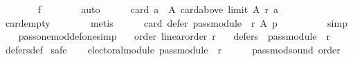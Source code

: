 \begin{isabellebody}
\ \ \ \ \ \ \isamarkupfalse%
\ f{}\isanewline
\ \ \ \ \ \ \isamarkupfalse%
\ auto\isanewline
\ \ \ \ \isamarkupfalse%
\ {\isachardoublequoteopen}card\ {\isacharbraceleft}{\kern0pt}a\ {\isasymin}\ A{\isachardot}{\kern0pt}\ card{\isacharparenleft}{\kern0pt}above\ {\isacharparenleft}{\kern0pt}limit\ A\ r{\isacharparenright}{\kern0pt}\ a{\isacharparenright}{\kern0pt}\ {\isasymle}\ {}{\isacharbraceright}{\kern0pt}\ {\isacharequal}{\kern0pt}\ {}{\isachardoublequoteclose}\isanewline
\ \ \ \ \ \ \isamarkupfalse%
\ card{\isachardot}{\kern0pt}empty\isanewline
\ \ \ \ \ \ \isamarkupfalse%
\ metis\isanewline
\ \ \ \ \isamarkupfalse%
\ {\isachardoublequoteopen}card\ {\isacharparenleft}{\kern0pt}defer\ {\isacharparenleft}{\kern0pt}pass{\isacharunderscore}{\kern0pt}module\ {}\ r{\isacharparenright}{\kern0pt}\ A\ p{\isacharparenright}{\kern0pt}\ {\isacharequal}{\kern0pt}\ {}{\isachardoublequoteclose}\isanewline
\ \ \ \ \ \ \isamarkupfalse%
\ simp\isanewline
\ \ \isamarkupfalse%
\isanewline
{}\isamarkupfalse%
%
\endisatagproof
{\isafoldproof}%
%
\isadelimproof
\isanewline
%
\endisadelimproof
\isanewline
\isanewline
{}\isamarkupfalse%
\ pass{\isacharunderscore}{\kern0pt}one{\isacharunderscore}{\kern0pt}mod{\isacharunderscore}{\kern0pt}def{\isacharunderscore}{\kern0pt}one{\isacharbrackleft}{\kern0pt}simp{\isacharbrackright}{\kern0pt}{\isacharcolon}{\kern0pt}\isanewline
\ \ \ order{\isacharcolon}{\kern0pt}\ {\isachardoublequoteopen}linear{\isacharunderscore}{\kern0pt}order\ r{\isachardoublequoteclose}\isanewline
\ \ \ {\isachardoublequoteopen}defers\ {}\ {\isacharparenleft}{\kern0pt}pass{\isacharunderscore}{\kern0pt}module\ {}\ r{\isacharparenright}{\kern0pt}{\isachardoublequoteclose}\isanewline
%
\isadelimproof
\ \ %
\endisadelimproof
%
\isatagproof
{}\isamarkupfalse%
\ defers{\isacharunderscore}{\kern0pt}def\isanewline
{}\isamarkupfalse%
\ {\isacharparenleft}{\kern0pt}safe{\isacharparenright}{\kern0pt}\isanewline
\ \ \isamarkupfalse%
\ {\isachardoublequoteopen}electoral{\isacharunderscore}{\kern0pt}module\ {\isacharparenleft}{\kern0pt}pass{\isacharunderscore}{\kern0pt}module\ {}\ r{\isacharparenright}{\kern0pt}{\isachardoublequoteclose}\isanewline
\ \ \ \ \isamarkupfalse%
\ pass{\isacharunderscore}{\kern0pt}mod{\isacharunderscore}{\kern0pt}sound\ order\isanewline

\end{isabellebody}
